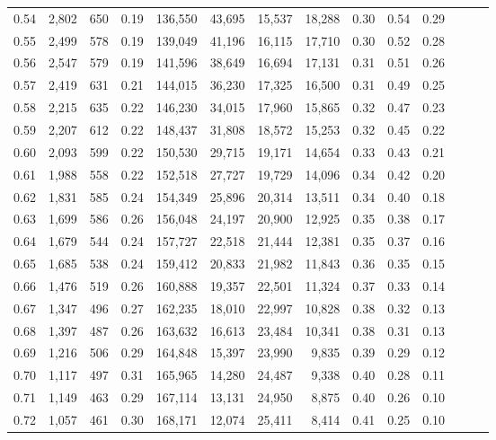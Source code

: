 \begin{tabular}{rrrrrrrrrrrrrr}
0.54 &  2,802 &  650 &  0.19 &  136,550 &   43,695 &  15,537 &  18,288 &  0.30 &  0.54 &      0.29 \\
0.55 &  2,499 &  578 &  0.19 &  139,049 &   41,196 &  16,115 &  17,710 &  0.30 &  0.52 &      0.28 \\
0.56 &  2,547 &  579 &  0.19 &  141,596 &   38,649 &  16,694 &  17,131 &  0.31 &  0.51 &      0.26 \\
0.57 &  2,419 &  631 &  0.21 &  144,015 &   36,230 &  17,325 &  16,500 &  0.31 &  0.49 &      0.25 \\
0.58 &  2,215 &  635 &  0.22 &  146,230 &   34,015 &  17,960 &  15,865 &  0.32 &  0.47 &      0.23 \\
0.59 &  2,207 &  612 &  0.22 &  148,437 &   31,808 &  18,572 &  15,253 &  0.32 &  0.45 &      0.22 \\
0.60 &  2,093 &  599 &  0.22 &  150,530 &   29,715 &  19,171 &  14,654 &  0.33 &  0.43 &      0.21 \\
0.61 &  1,988 &  558 &  0.22 &  152,518 &   27,727 &  19,729 &  14,096 &  0.34 &  0.42 &      0.20 \\
0.62 &  1,831 &  585 &  0.24 &  154,349 &   25,896 &  20,314 &  13,511 &  0.34 &  0.40 &      0.18 \\
0.63 &  1,699 &  586 &  0.26 &  156,048 &   24,197 &  20,900 &  12,925 &  0.35 &  0.38 &      0.17 \\
0.64 &  1,679 &  544 &  0.24 &  157,727 &   22,518 &  21,444 &  12,381 &  0.35 &  0.37 &      0.16 \\
0.65 &  1,685 &  538 &  0.24 &  159,412 &   20,833 &  21,982 &  11,843 &  0.36 &  0.35 &      0.15 \\
0.66 &  1,476 &  519 &  0.26 &  160,888 &   19,357 &  22,501 &  11,324 &  0.37 &  0.33 &      0.14 \\
0.67 &  1,347 &  496 &  0.27 &  162,235 &   18,010 &  22,997 &  10,828 &  0.38 &  0.32 &      0.13 \\
0.68 &  1,397 &  487 &  0.26 &  163,632 &   16,613 &  23,484 &  10,341 &  0.38 &  0.31 &      0.13 \\
0.69 &  1,216 &  506 &  0.29 &  164,848 &   15,397 &  23,990 &   9,835 &  0.39 &  0.29 &      0.12 \\
0.70 &  1,117 &  497 &  0.31 &  165,965 &   14,280 &  24,487 &   9,338 &  0.40 &  0.28 &      0.11 \\
0.71 &  1,149 &  463 &  0.29 &  167,114 &   13,131 &  24,950 &   8,875 &  0.40 &  0.26 &      0.10 \\
0.72 &  1,057 &  461 &  0.30 &  168,171 &   12,074 &  25,411 &   8,414 &  0.41 &  0.25 &      0.10 \\

\end{tabular}
